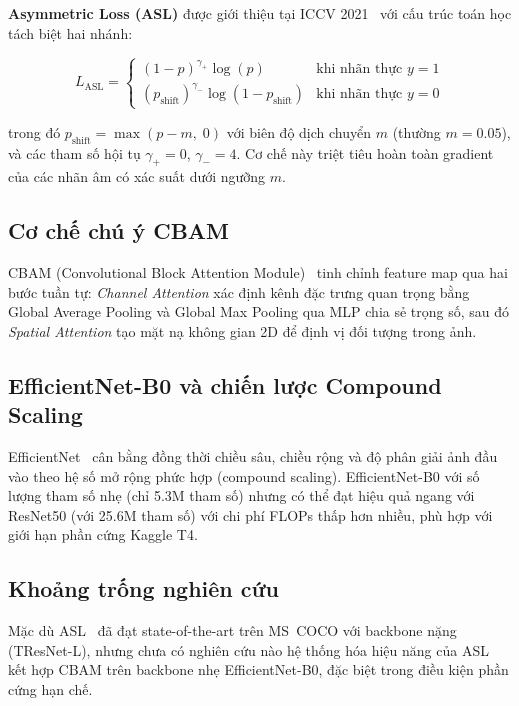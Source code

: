 \documentclass{article}
\begin{document}
\noindent\textbf{Asymmetric Loss (ASL)} được giới thiệu tại ICCV 2021~\cite{ridnik2021asl}
với cấu trúc toán học tách biệt hai nhánh:

\begin{equation}
  L_{\mathrm{ASL}} =
  \begin{cases}
    (1-p)^{\gamma_{+}} \log(p) & \text{khi nhãn thực } y = 1 \\
    (p_{\mathrm{shift}})^{\gamma_{-}} \log(1 - p_{\mathrm{shift}}) & \text{khi nhãn thực } y = 0
  \end{cases}
  \label{eq:asl}
\end{equation}

\noindent trong đó $p_{\mathrm{shift}} = \max(p - m,\; 0)$ với biên độ dịch chuyển
$m$ (thường $m = 0.05$), và các tham số hội tụ $\gamma_{+} = 0$,
$\gamma_{-} = 4$. Cơ chế này triệt tiêu hoàn toàn gradient của các nhãn âm có
xác suất dưới ngưỡng $m$.

\subsection{Cơ chế chú ý CBAM}

CBAM (Convolutional Block Attention Module)~\cite{woo2018cbam} tinh chỉnh feature
map qua hai bước tuần tự: \textit{Channel Attention} xác định kênh
đặc trưng quan trọng bằng Global Average Pooling và Global Max Pooling qua MLP
chia sẻ trọng số, sau đó \textit{Spatial Attention} tạo mặt nạ
không gian 2D để định vị đối tượng trong ảnh.

\subsection{EfficientNet-B0 và chiến lược Compound Scaling}

EfficientNet~\cite{tan2019efficientnet} cân bằng đồng thời chiều sâu, chiều rộng
và độ phân giải ảnh đầu vào theo hệ số mở rộng phức hợp (compound scaling).
EfficientNet-B0 với số lượng tham số nhẹ (chỉ 5.3M tham số) nhưng có thể đạt hiệu quả ngang với ResNet50 (với 25.6M tham số)
với chi phí FLOPs thấp hơn nhiều, phù hợp với giới hạn phần cứng Kaggle T4.

\subsection{Khoảng trống nghiên cứu}

Mặc dù ASL~\cite{ridnik2021asl} đã đạt state-of-the-art trên MS~COCO với backbone
nặng (TResNet-L), nhưng chưa có nghiên cứu nào hệ thống hóa hiệu năng của ASL
kết hợp CBAM trên backbone nhẹ EfficientNet-B0, đặc biệt trong điều kiện phần cứng hạn chế.
\end{document}
